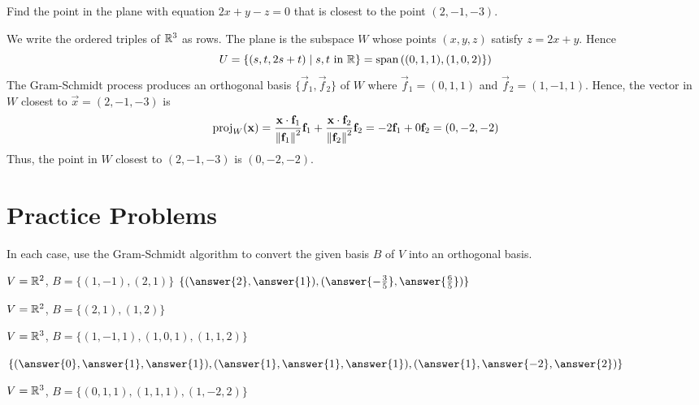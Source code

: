 \documentclass{ximera}
\begin{document}
\begin{example}\label{023934}
Find the point in the plane with equation $2x + y - z = 0$ that is closest to the point $(2, -1, -3)$.

\begin{explanation}
  We write the ordered triples of $\mathbb{R}^3$ as rows. The plane is the subspace $W$ whose points $(x, y, z)$ satisfy $z = 2x + y$. Hence
\begin{equation*}
U = \{(s, t, 2s + t) \mid s,t \mbox{ in }\mathbb{R}\} = \mbox{span}\left((0, 1, 1),(1, 0, 2)\}\right)
\end{equation*}
The Gram-Schmidt process produces an orthogonal basis $\{\vec{f}_{1}, \vec{f}_{2}\}$ of $W$ where $\vec{f}_{1} = (0, 1, 1)$ and $\vec{f}_{2} = (1, -1, 1)$. Hence, the vector in $W$ closest to $\vec{x} = (2, -1, -3)$ is
\begin{equation*}
\mbox{proj}_W(\mathbf{x}) =\frac{\mathbf{x} \cdot \mathbf{f}_{1}}{\left\lVert\mathbf{f}_{1}\right\rVert^2}\mathbf{f}_{1} + \frac{\mathbf{x} \cdot \mathbf{f}_{2}}{\left\lVert\mathbf{f}_{2}\right\rVert^2}\mathbf{f}_{2} = -2\mathbf{f}_{1} + 0\mathbf{f}_{2} = (0, -2, -2)
\end{equation*}
Thus, the point in $W$ closest to $(2, -1, -3)$ is $(0, -2, -2)$.
\end{explanation}
\end{example}

\section*{Practice Problems}

\begin{problem}
In each case, use the Gram-Schmidt algorithm to convert the given basis $B$ of $V$ into an orthogonal basis.  

\begin{problem}\label{GS1}
$V = \mathbb{R}^2$, $B = \{(1, -1), (2, 1)\}$
$\{(\answer{2},\answer{1}),(\answer{-\frac{3}{5}},\answer{\frac{6}{5}})\}$
\end{problem}
\begin{problem}
$V = \mathbb{R}^2$, $B = \{(2, 1), (1, 2)\}$
\end{problem}
\begin{problem}
$V = \mathbb{R}^3$, $B = \{(1, -1, 1), (1, 0, 1), (1, 1, 2)\}$

$\{(\answer{0},\answer{1},\answer{1}),(\answer{1},\answer{1},\answer{1}),(\answer{1},\answer{-2},\answer{2})\}$
\end{problem}
\begin{problem}
$V = \mathbb{R}^3$, $B = \{(0, 1, 1), (1, 1, 1), (1, -2, 2)\}$
\end{problem}
\end{problem}
\end{document}
